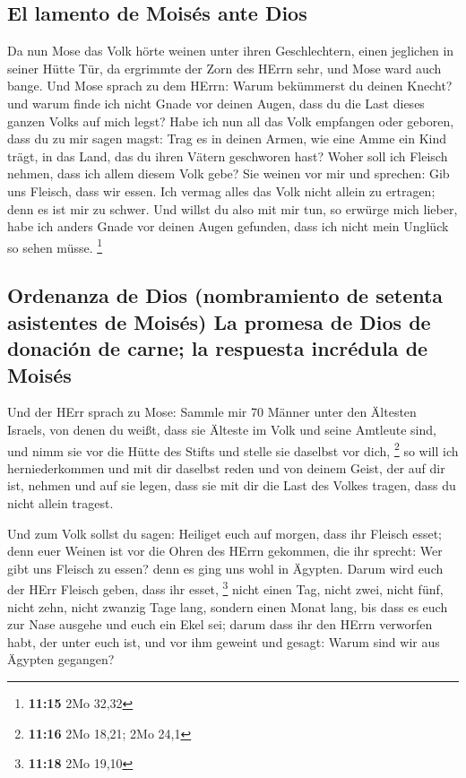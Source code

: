 \hypertarget{el-lamento-de-moisuxe9s-ante-dios}{%
\subsection{El lamento de Moisés ante
Dios}\label{el-lamento-de-moisuxe9s-ante-dios}}

 Da nun Mose das Volk hörte weinen unter ihren
Geschlechtern, einen jeglichen in seiner Hütte Tür, da ergrimmte der
Zorn des HErrn sehr, und Mose ward auch bange.  Und Mose
sprach zu dem HErrn: Warum bekümmerst du deinen Knecht? und warum finde
ich nicht Gnade vor deinen Augen, dass du die Last dieses ganzen Volks
auf mich legst?  Habe ich nun all das Volk empfangen oder
geboren, dass du zu mir sagen magst: Trag es in deinen Armen, wie eine
Amme ein Kind trägt, in das Land, das du ihren Vätern geschworen hast?
 Woher soll ich Fleisch nehmen, dass ich allem diesem
Volk gebe? Sie weinen vor mir und sprechen: Gib uns Fleisch, dass wir
essen.  Ich vermag alles das Volk nicht allein zu
ertragen; denn es ist mir zu schwer.  Und willst du also
mit mir tun, so erwürge mich lieber, habe ich anders Gnade vor deinen
Augen gefunden, dass ich nicht mein Unglück so sehen müsse. \footnote{\textbf{11:15}
  2Mo 32,32}

\hypertarget{ordenanza-de-dios-nombramiento-de-setenta-asistentes-de-moisuxe9s-la-promesa-de-dios-de-donaciuxf3n-de-carne-la-respuesta-incruxe9dula-de-moisuxe9s}{%
\subsection{Ordenanza de Dios (nombramiento de setenta asistentes de
Moisés) La promesa de Dios de donación de carne; la respuesta incrédula
de
Moisés}\label{ordenanza-de-dios-nombramiento-de-setenta-asistentes-de-moisuxe9s-la-promesa-de-dios-de-donaciuxf3n-de-carne-la-respuesta-incruxe9dula-de-moisuxe9s}}

 Und der HErr sprach zu Mose: Sammle mir 70 Männer unter
den Ältesten Israels, von denen du weißt, dass sie Älteste im Volk und
seine Amtleute sind, und nimm sie vor die Hütte des Stifts und stelle
sie daselbst vor dich, \footnote{\textbf{11:16} 2Mo 18,21; 2Mo 24,1}
 so will ich herniederkommen und mit dir daselbst reden
und von deinem Geist, der auf dir ist, nehmen und auf sie legen, dass
sie mit dir die Last des Volkes tragen, dass du nicht allein tragest.

 Und zum Volk sollst du sagen: Heiliget euch auf morgen,
dass ihr Fleisch esset; denn euer Weinen ist vor die Ohren des HErrn
gekommen, die ihr sprecht: Wer gibt uns Fleisch zu essen? denn es ging
uns wohl in Ägypten. Darum wird euch der HErr Fleisch geben, dass ihr
esset, \footnote{\textbf{11:18} 2Mo 19,10}  nicht einen
Tag, nicht zwei, nicht fünf, nicht zehn, nicht zwanzig Tage lang,
 sondern einen Monat lang, bis dass es euch zur Nase
ausgehe und euch ein Ekel sei; darum dass ihr den HErrn verworfen habt,
der unter euch ist, und vor ihm geweint und gesagt: Warum sind wir aus
Ägypten gegangen?

